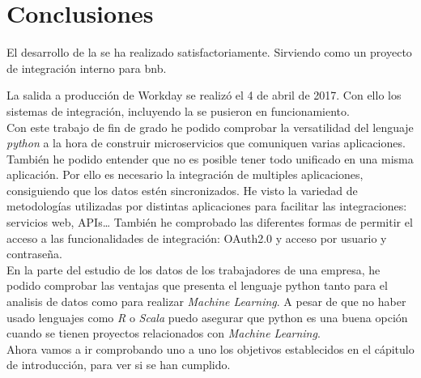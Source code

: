 \chapter{Conclusiones}

El desarrollo de la \iface{} se ha realizado satisfactoriamente. Sirviendo como un proyecto de integración interno para \acrshort{bnb}.

La salida a producción de Workday se realizó el 4 de abril de 2017. Con ello los sistemas de integración, incluyendo la \iface{} se pusieron en funcionamiento.\\



Con este trabajo de fin de grado he podido comprobar la versatilidad del lenguaje \textit{python} a la hora de construir microservicios que comuniquen varias aplicaciones.
También he podido entender que no es posible tener todo unificado en una misma aplicación. Por ello es necesario la integración de multiples aplicaciones, consiguiendo que los datos estén sincronizados.
He visto la variedad de metodologías utilizadas por distintas aplicaciones para facilitar las integraciones: servicios web, APIs\ldots
También he comprobado las diferentes formas de permitir el acceso a las funcionalidades de integración: OAuth2.0 y acceso por usuario y contraseña.\\



En la parte del estudio de los datos de los trabajadores de una empresa, he podido comprobar las ventajas que presenta el lenguaje python tanto para el analisis de datos como para realizar \textit{Machine Learning}.
A pesar de que no haber usado lenguajes como \textit{R} o \textit{Scala} puedo asegurar que python es una buena opción cuando se tienen proyectos relacionados con \textit{Machine Learning}.\\


Ahora vamos a ir comprobando uno a uno los objetivos establecidos en el cápitulo de introducción, para ver si se han cumplido.

